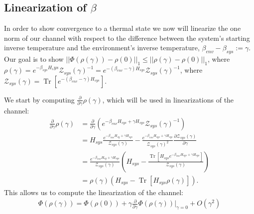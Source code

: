 \documentclass{article}
\newcommand{\parens}[1]{\left( #1 \right)}
\newcommand{\brackets}[1]{\left[ #1 \right]}
\newcommand{\norm}[1]{\left| \left| #1 \right| \right|}
\newcommand{\bigo}[1]{O\left( #1 \right)}
\DeclareMathOperator{\Tr}{Tr}
\newcommand{\trace}[1]{\Tr \brackets{ #1 }}
\newcommand{\partrace}[2]{\Tr_{#1} \brackets{ #2 }}
\newcommand{\partfun}{\mathcal{Z}}
\begin{document}

\subsection{Linearization of $\beta$}
In order to show convergence to a thermal state we now will linearize the one norm of our channel with respect to the difference between the system's starting inverse temperature and the environment's inverse temperature, $\beta_{env} - \beta_{sys} := \gamma$. Our goal is to show $\norm{\Phi(\rho(\gamma)) - \rho(0)}_1 \leq \norm{\rho(\gamma) - \rho(0)}_1$, where $\rho(\gamma) = e^{- \beta_{sys} H_sys} \partfun_{sys}(\gamma)^{-1} = e^{-(\beta_{env} - \gamma) H_{sys}} \partfun_{sys}(\gamma)^{-1}$, where $\partfun_{sys}(\gamma) = \trace{e^{-(\beta_{env} - \gamma) H_{sys}}}$.

We start by computing $\frac{\partial}{\partial \gamma}\rho(\gamma)$, which will be used in linearizations of the channel:
\begin{align}
    \frac{\partial}{\partial \gamma} \rho(\gamma) &= \frac{\partial}{\partial \gamma} \parens{e^{-\beta_{env} H_{sys} + \gamma H_{sys}} \partfun_{sys}(\gamma)^{-1}} \\
    &= H_{sys} \frac{e^{-\beta_{env} H_{sy} + \gamma H_{sys}}}{\partfun_{sys}(\gamma)} - \frac{e^{-\beta_{env} H_{sys} + \gamma H_{sys}}}{\partfun_{sys}(\gamma)^2} \frac{\partial \partfun_{sys}(\gamma)}{\partial \gamma} \\
    &= \frac{e^{-\beta_{env} H_{sy} + \gamma H_{sys}}}{\partfun_{sys}(\gamma)} \parens{H_{sys} - \frac{\trace{H_{sys} e^{-\beta_{env} H_{sys} + \gamma H_{sys}}} }{\partfun_{sys}(\gamma)}} \\
    &= \rho(\gamma) \parens{H_{sys} - \trace{H_{sys} \rho(\gamma)}}.
\end{align}
This allows us to compute the linearization of the channel:
\begin{align}
    \Phi(\rho(\gamma)) = \Phi(\rho(0)) + \gamma \frac{\partial}{\partial \gamma} \Phi(\rho(\gamma))\bigg|_{\gamma = 0} + \bigo{\gamma^2}
\end{align}
\end{document}

